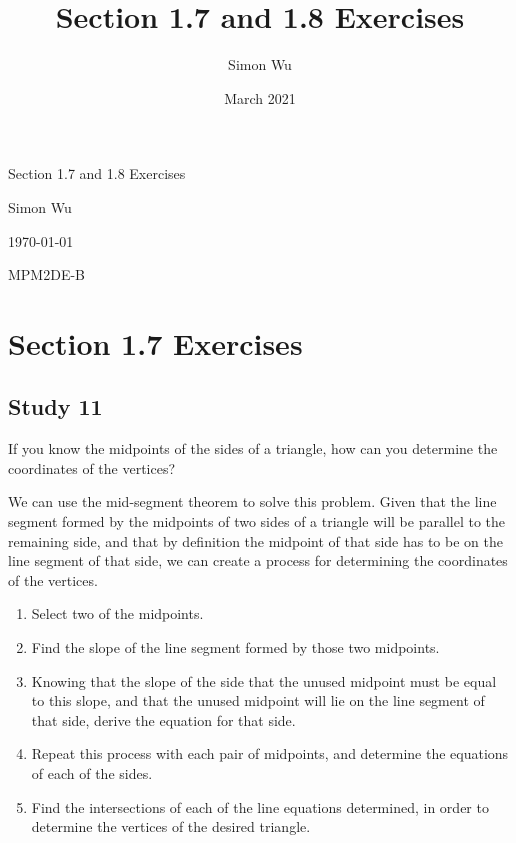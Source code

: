 \documentclass[12pt]{article}
\title{Section 1.7 and 1.8 Exercises}
\author{Simon Wu}
\date{March 2021}
\begin{document}
\begin{titlepage}

\begin{center}
    \Huge{Section 1.7 and 1.8 Exercises}
    
    \vspace{1in}
    
    \Large{Simon Wu}
    
    \Large{\today}
    
    \vspace{1in}
    
    \Large{MPM2DE-B}

    
\end{center}

\end{titlepage}

\section*{Section 1.7 Exercises}

\subsection*{Study 11}

\begin{displayquote}
If you know the midpoints of the sides of a triangle, how can you determine the coordinates of the vertices?
\end{displayquote}

We can use the mid-segment theorem to solve this problem.
Given that the line segment formed by the midpoints of two sides of a triangle will be parallel to the remaining side, and that by definition the midpoint of that side has to be on the line segment of that side, we can create a process for determining the coordinates of the vertices.

\begin{enumerate}
    \item Select two of the midpoints.
    \item Find the slope of the line segment formed by those two midpoints.
    \item Knowing that the slope of the side that the unused midpoint must be equal to this slope, and that the unused midpoint will lie on the line segment of that side, derive the equation for that side.
    \item Repeat this process with each pair of midpoints, and determine the equations of each of the sides.
    \item Find the intersections of each of the line equations determined, in order to determine the vertices of the desired triangle.
\end{enumerate}
\end{document}
